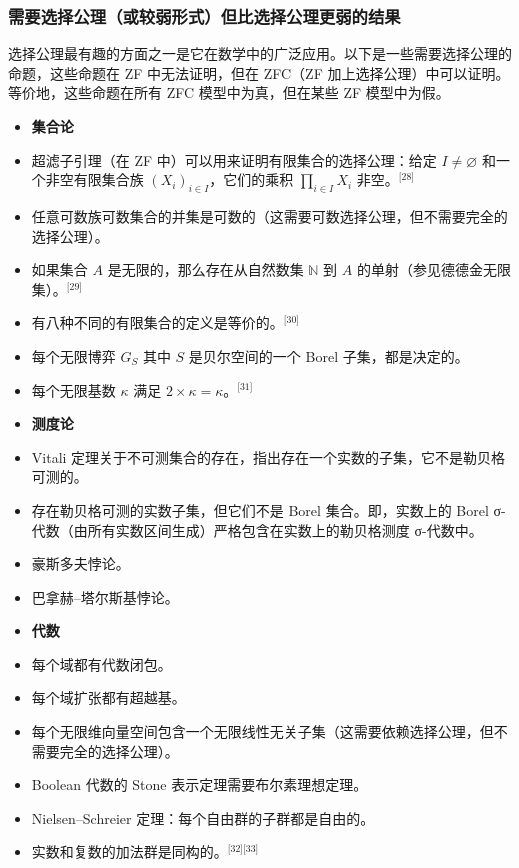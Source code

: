 \subsubsection{需要选择公理（或较弱形式）但比选择公理更弱的结果}  
选择公理最有趣的方面之一是它在数学中的广泛应用。以下是一些需要选择公理的命题，这些命题在 ZF 中无法证明，但在 ZFC（ZF 加上选择公理）中可以证明。等价地，这些命题在所有 ZFC 模型中为真，但在某些 ZF 模型中为假。
\begin{itemize}
\item \textbf{集合论}  
\item 超滤子引理（在 ZF 中）可以用来证明有限集合的选择公理：给定 \( I \neq \varnothing \) 和一个非空有限集合族 \(\left(X_i\right)_{i \in I}\)，它们的乘积 \(\prod_{i \in I} X_i\) 非空。\(^\text{[28]}\)  
\item 任意可数族可数集合的并集是可数的（这需要可数选择公理，但不需要完全的选择公理）。  
\item 如果集合 \(A\) 是无限的，那么存在从自然数集 \(\mathbb{N}\) 到 \(A\) 的单射（参见德德金无限集）。\(^\text{[29]}\)  
\item 有八种不同的有限集合的定义是等价的。\(^\text{[30]}\)  
\item 每个无限博弈 \(G_S\) 其中 \(S\) 是贝尔空间的一个 Borel 子集，都是决定的。  
\end{itemize}
\begin{itemize}
\item 每个无限基数 \(\kappa\) 满足 \(2 \times \kappa = \kappa\)。\(^\text{[31]}\)
\end{itemize}
\begin{itemize}
\item \textbf{测度论}  
\item Vitali 定理关于不可测集合的存在，指出存在一个实数的子集，它不是勒贝格可测的。  
\item 存在勒贝格可测的实数子集，但它们不是 Borel 集合。即，实数上的 Borel σ-代数（由所有实数区间生成）严格包含在实数上的勒贝格测度 σ-代数中。  
\item 豪斯多夫悖论。  
\item 巴拿赫–塔尔斯基悖论。
\end{itemize}
\begin{itemize}
\item \textbf{代数}  
\item 每个域都有代数闭包。  
\item 每个域扩张都有超越基。  
\item 每个无限维向量空间包含一个无限线性无关子集（这需要依赖选择公理，但不需要完全的选择公理）。  
\item Boolean 代数的 Stone 表示定理需要布尔素理想定理。  
\item Nielsen–Schreier 定理：每个自由群的子群都是自由的。  
\item 实数和复数的加法群是同构的。\(^\text{[32][33]}\)
\end{itemize}

